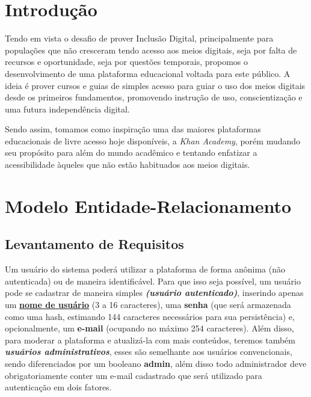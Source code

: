\chapter{Introdução}

Tendo em vista o desafio de prover Inclusão Digital, principalmente para
populações que não cresceram tendo acesso aos meios digitais, seja por falta de
recursos e oportunidade, seja por questões temporais, propomos o
desenvolvimento de uma plataforma educacional voltada para este público. A
ideia é prover cursos e guias de simples acesso para guiar o uso dos meios
digitais desde os primeiros fundamentos, promovendo instrução de uso,
conscientização e uma futura independência digital.

Sendo assim, tomamos como inspiração uma das maiores plataformas educacionais
de livre acesso hoje disponíveis, a \textit{Khan Academy}, porém mudando seu
propósito para além do mundo acadêmico e tentando enfatizar a acessibilidade
àqueles que não estão habituados aos meios digitais.

\chapter{Modelo Entidade-Relacionamento}


\section{Levantamento de Requisitos}


Um usuário do sistema poderá utilizar a plataforma de forma anônima (não
autenticada) ou de maneira identificável. Para que isso seja possível, um
usuário pode se cadastrar de maneira simples \textbf{\textit{(usuário
    autenticado)}}, inserindo apenas um \textbf{\underline{nome de usuário}} (3 a
16 caracteres), uma \textbf{senha} (que será armazenada como uma hash,
estimando 144 caracteres necessários para sua persistência) e, opcionalmente,
um \textbf{e-mail} (ocupando no máximo 254 caracteres). Além disso, para
moderar a plataforma e atualizá-la com mais conteúdos, teremos também
\textbf{\textit{usuários administrativos}}, esses são semelhante aos usuários
convencionais, sendo diferenciados por um booleano \textbf{admin}, além disso
todo administrador deve obrigatoriamente conter um e-mail cadastrado que será
utilizado para autenticação em dois fatores.

